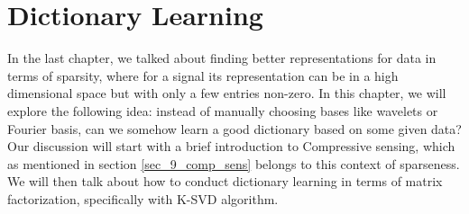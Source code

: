 \documentclass[../main.tex]{subfiles}
\begin{document}

\chapter{Dictionary Learning}
In the last chapter, we talked about finding better representations for data in terms of sparsity, where for a signal its representation can be in a high dimensional space but with only a few entries non-zero. In this chapter, we will explore the following idea: instead of manually choosing bases like wavelets or Fourier basis, can we somehow learn a good dictionary based on some given data? Our discussion will start with a brief introduction to Compressive sensing, which as mentioned in section \ref{sec_9_comp_sens} belongs to this context of sparseness. We will then talk about how to conduct dictionary learning in terms of matrix factorization, specifically with K-SVD algorithm.
\end{document}
